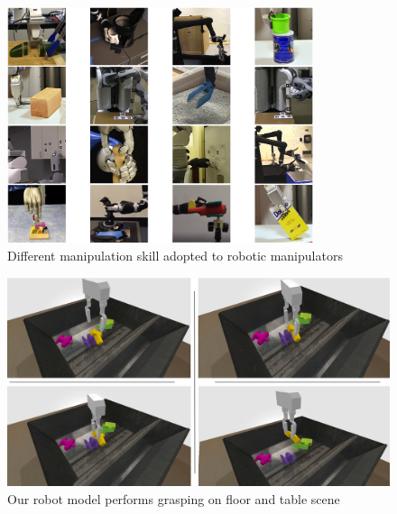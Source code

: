 \begin{figure}[htbp]
    \centering
      \includegraphics[width=0.8\textwidth]{figures/manipulation_skill}
    \caption{Different manipulation skill adopted to robotic manipulators \cite{Kroemer2019}}
    \label{fig:x manipulation_skills}
\end{figure}




\begin{figure}[htbp]
  \centering
    \includegraphics[width=1.\textwidth]{figures/newtable}
  \caption{ Our robot model performs grasping on floor and table scene\label{fig:graspseq}}
\end{figure}

